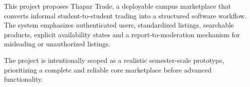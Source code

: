 \documentclass[11pt,a4paper]{article}
\begin{document}
This project proposes Thapar Trade, a deployable campus marketplace
that converts informal student-to-student trading into a structured
software workflow. The system emphasizes authenticated users,
standardized listings, searchable products, explicit availability
states and a report-to-moderation mechanism for misleading or
unauthorized listings.

The project is intentionally scoped as a realistic semester-scale
prototype, prioritizing a complete and reliable core marketplace
before advanced functionality.

\end{document}
